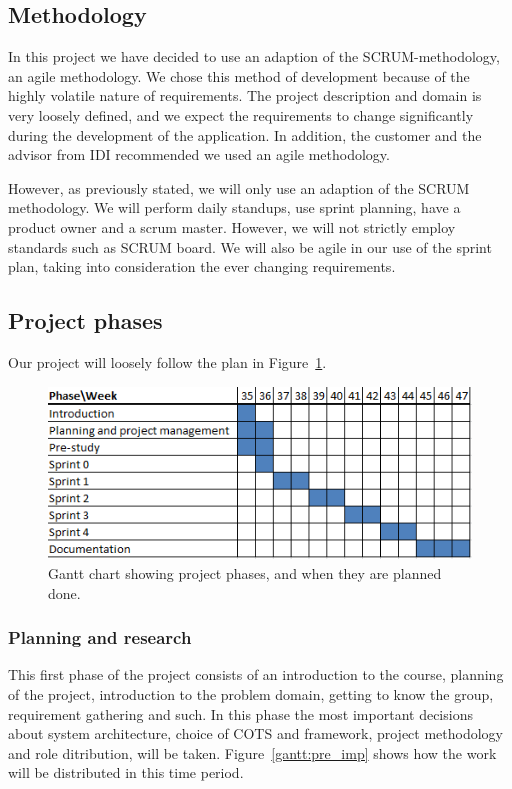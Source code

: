 \subsection{Methodology}
In this project we have decided to use an adaption of the SCRUM-methodology, an agile methodology. We chose this method of development because of the highly volatile nature of requirements. The project description and domain is very loosely defined, and we expect the requirements to change significantly during the development of the application. In addition, the customer and the advisor from IDI recommended we used an agile methodology.

However, as previously stated, we will only use an adaption of the SCRUM methodology. We will perform daily standups, use sprint planning, have a product owner and a scrum master. However, we will not strictly employ standards such as SCRUM board. We will also be agile in our use of the sprint plan, taking into consideration the ever changing requirements.

\subsection{Project phases}
Our project will loosely follow the plan in Figure~\ref{gantt:project}.

\begin{figure}[h]
\centering
  \includegraphics{project_management/project_effort_estimation}
  \caption[Gantt chart of project phases]{Gantt chart showing project phases, and when they are planned done.}
  \label{gantt:project}
\end{figure}

\subsubsection{Planning and research}
This first phase of the project consists of an introduction to the course, planning of the project, introduction to the problem domain, getting to know the group, requirement gathering and such. In this phase the most important decisions about system architecture, choice of COTS and framework, project methodology and role ditribution, will be taken. Figure~\ref{gantt:pre_imp} shows how the work will be distributed in this time period.

